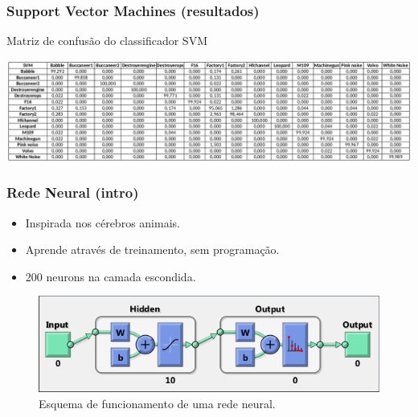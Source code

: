 \documentclass{beamer}
\begin{document}
\begin{frame}

	\frametitle{Support Vector Machines  (resultados)}
	
	\begin{table}[h]
		\centering
		\caption{Matriz de confusão do classificador SVM}
		\label{tab:confusion_svm}
		\includegraphics[width=\textwidth]{conf_svm.png}
	\end{table}
	
\end{frame}



\begin{frame}

	\frametitle{Rede Neural (intro)}
	
	\begin{minipage}{.45\textwidth}
	
		\begin{itemize}
			\item Inspirada nos cérebros animais.
			\item Aprende através de treinamento, sem programação.
			\item 200 neurons na camada escondida.
		\end{itemize}
	
	\end{minipage}
	\begin{minipage}{.5\textwidth}
		\begin{figure}
			\includegraphics[width=\linewidth]{nn01.png}
  			\caption{Esquema de funcionamento de uma rede neural.}
  			\label{fig:nn1}
		\end{figure}
	\end{minipage}
	
\end{frame}
\end{document}
